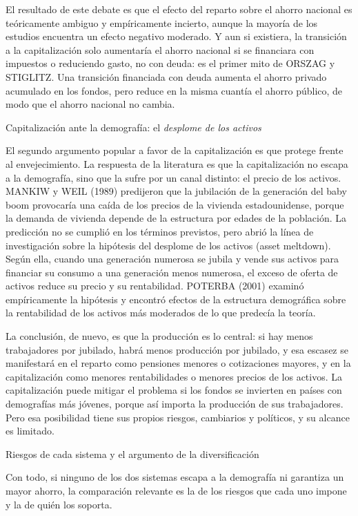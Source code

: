 \documentclass[10pt,a4paper]{article}
\begin{document}
El resultado de este debate es que el efecto del reparto sobre el ahorro nacional es teóricamente ambiguo y empíricamente incierto, aunque la mayoría de los estudios encuentra un efecto negativo moderado. Y aun si existiera, la transición a la capitalización solo aumentaría el ahorro nacional si se financiara con impuestos o reduciendo gasto, no con deuda: es el primer mito de ORSZAG y STIGLITZ. Una transición financiada con deuda aumenta el ahorro privado acumulado en los fondos, pero reduce en la misma cuantía el ahorro público, de modo que el ahorro nacional no cambia.

Capitalización ante la demografía: el \textit{desplome de los activos}

El segundo argumento popular a favor de la capitalización es que protege frente al envejecimiento. La respuesta de la literatura es que la capitalización no escapa a la demografía, sino que la sufre por un canal distinto: el precio de los activos. MANKIW y WEIL (1989) predijeron que la jubilación de la generación del baby boom provocaría una caída de los precios de la vivienda estadounidense, porque la demanda de vivienda depende de la estructura por edades de la población. La predicción no se cumplió en los términos previstos, pero abrió la línea de investigación sobre la hipótesis del desplome de los activos (asset meltdown). Según ella, cuando una generación numerosa se jubila y vende sus activos para financiar su consumo a una generación menos numerosa, el exceso de oferta de activos reduce su precio y su rentabilidad. POTERBA (2001) examinó empíricamente la hipótesis y encontró efectos de la estructura demográfica sobre la rentabilidad de los activos más moderados de lo que predecía la teoría. 

La conclusión, de nuevo, es que la producción es lo central: si hay menos trabajadores por jubilado, habrá menos producción por jubilado, y esa escasez se manifestará en el reparto como pensiones menores o cotizaciones mayores, y en la capitalización como menores rentabilidades o menores precios de los activos. La capitalización puede mitigar el problema si los fondos se invierten en países con demografías más jóvenes, porque así importa la producción de sus trabajadores. Pero esa posibilidad tiene sus propios riesgos, cambiarios y políticos, y su alcance es limitado.

Riesgos de cada sistema y el argumento de la diversificación

Con todo, si ninguno de los dos sistemas escapa a la demografía ni garantiza un mayor ahorro, la comparación relevante es la de los riesgos que cada uno impone y la de quién los soporta. 
\end{document}
